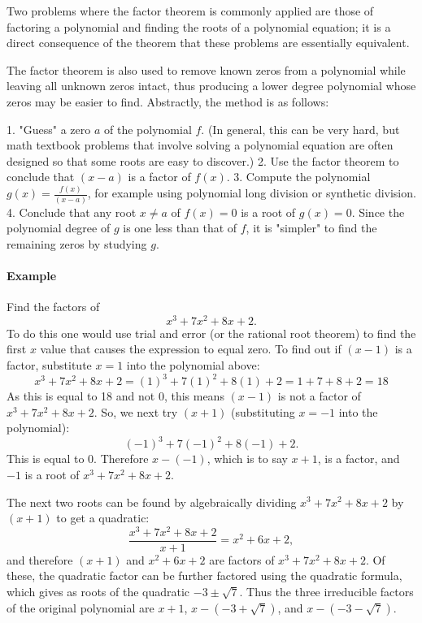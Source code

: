 Two problems where the factor theorem is commonly applied are those of factoring a polynomial and finding the roots of a polynomial equation; it is a direct consequence of the theorem that these problems are essentially equivalent.

The factor theorem is also used to remove known zeros from a polynomial while leaving all unknown zeros intact, thus producing a lower degree polynomial whose zeros may be easier to find. Abstractly, the method is as follows:

1. "Guess" a zero $a$ of the polynomial $f$. (In general, this can be very hard, but math textbook problems that involve solving a polynomial equation are often designed so that some roots are easy to discover.)
2. Use the factor theorem to conclude that $(x - a)$ is a factor of $f(x)$.
3. Compute the polynomial $g(x) = \frac{f(x)}{(x - a)}$, for example using polynomial long division or synthetic division.
4. Conclude that any root $x \neq a$ of $f(x) = 0$ is a root of $g(x) = 0$. Since the polynomial degree of $g$ is one less than that of $f$, it is "simpler" to find the remaining zeros by studying $g$.

\paragraph{Example}

Find the factors of
$$
x^3 + 7x^2 + 8x + 2.
$$
To do this one would use trial and error (or the rational root theorem) to find the first $x$ value that causes the expression to equal zero. To find out if $(x - 1)$ is a factor, substitute $x = 1$ into the polynomial above:
$$
x^3 + 7x^2 + 8x + 2 = (1)^3 + 7(1)^2 + 8(1) + 2 = 1 + 7 + 8 + 2 = 18
$$
As this is equal to 18 and not 0, this means $(x - 1)$ is not a factor of $x^3 + 7x^2 + 8x + 2$. So, we next try $(x + 1)$ (substituting $x = -1$ into the polynomial):
$$
(-1)^3 + 7(-1)^2 + 8(-1) + 2.
$$
This is equal to 0. Therefore $x - (-1)$, which is to say $x + 1$, is a factor, and $-1$ is a root of $x^3 + 7x^2 + 8x + 2$.

The next two roots can be found by algebraically dividing $x^3 + 7x^2 + 8x + 2$ by $(x + 1)$ to get a quadratic:
$$
\frac{x^3 + 7x^2 + 8x + 2}{x + 1} = x^2 + 6x + 2,
$$
and therefore $(x + 1)$ and $x^2 + 6x + 2$ are factors of $x^3 + 7x^2 + 8x + 2$. Of these, the quadratic factor can be further factored using the quadratic formula, which gives as roots of the quadratic $-3 \pm \sqrt{7}$. Thus the three irreducible factors of the original polynomial are $x + 1$, $x - (-3 + \sqrt{7})$, and $x - (-3 - \sqrt{7})$.

